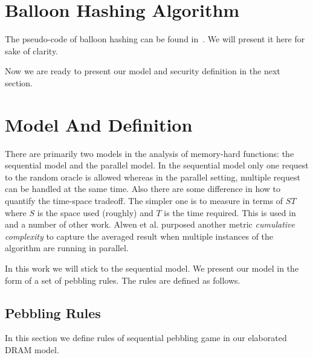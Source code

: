 \documentclass[a4paper]{article}
\begin{document}
\section{Balloon Hashing Algorithm}\label{sec::balloonHashing}

The pseudo-code of balloon hashing can be found in~\cite{corrigan2016balloon}.
We will present it here for sake of clarity.





Now we are ready to present our model and security definition in the next section.

\section{Model And Definition}\label{sec::model}
There are primarily two models in the analysis of memory-hard functions: the sequential model and
the parallel model. In the sequential model only one request to the random oracle is allowed whereas
in the parallel setting, multiple request can be handled at the same time. Also there are some
difference in how to quantify the time-space tradeoff. The simpler one is to measure in terms of
$ST$ where $S$ is the space used (roughly) and $T$ is the time required. This is used in~\cite{corrigan2016balloon}
and a number of other work. Alwen et al. purposed another metric \textit{cumulative complexity} to
capture the averaged result when multiple instances of the algorithm are running in parallel.

In this work we will stick to the sequential model. We present our model in the form of a set of pebbling rules.
The rules are defined as follows.

\subsection{Pebbling Rules}\label{subsec::pebblingRules}

In this section we define rules of sequential pebbling game in our elaborated DRAM model.
\end{document}
